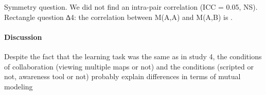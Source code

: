 \documentclass[twocolumn]{article}
\begin{document}
Symmetry question.  We did not find an intra-pair correlation (ICC = 0.05, NS).
Rectangle question ∆4: the correlation between M(A,A) and M(A,B) is .

\paragraph{Discussion}

Despite the fact that the learning task was the same as in study 4, the
conditions of collaboration (viewing multiple maps or not) and the conditions
(scripted or not, awareness tool or not) probably explain differences in terms
of mutual modeling





\end{document}
